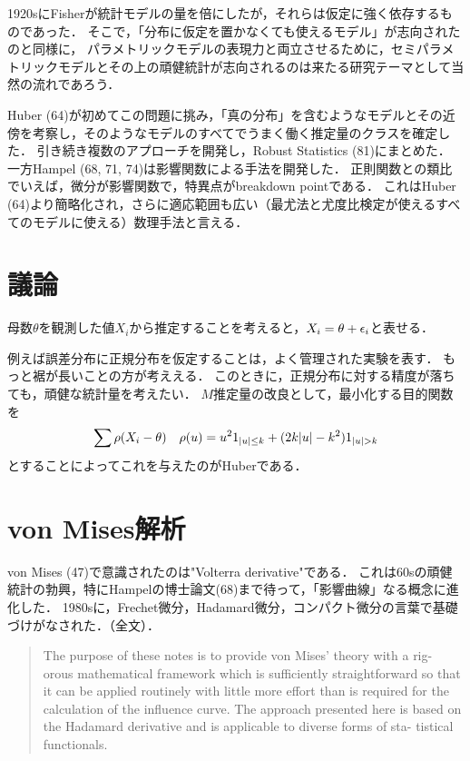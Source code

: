 \documentclass[uplatex,dvipdfmx]{jsreport}
\begin{document}
\begin{history}
    1920sにFisherが統計モデルの量を倍にしたが，それらは仮定に強く依存するものであった．
    そこで，「分布に仮定を置かなくても使えるモデル」が志向されたのと同様に，
    パラメトリックモデルの表現力と両立させるために，セミパラメトリックモデルとその上の頑健統計が志向されるのは来たる研究テーマとして当然の流れであろう．

    Huber (64)が初めてこの問題に挑み，「真の分布」を含むようなモデルとその近傍を考察し，そのようなモデルのすべてでうまく働く推定量のクラスを確定した．
    引き続き複数のアプローチを開発し，Robust Statistics (81)にまとめた．
    一方Hampel (68, 71, 74)は影響関数による手法を開発した．
    正則関数との類比でいえば，微分が影響関数で，特異点がbreakdown pointである．
    これはHuber (64)より簡略化され，さらに適応範囲も広い（最尤法と尤度比検定が使えるすべてのモデルに使える）数理手法と言える．
\end{history}

\section{議論}

母数$\theta$を観測した値$X_i$から推定することを考えると，$X_i=\theta+\epsilon_i$と表せる．


例えば誤差分布に正規分布を仮定することは，よく管理された実験を表す．
もっと裾が長いことの方が考ええる．
このときに，正規分布に対する精度が落ちても，頑健な統計量を考えたい．
$M$推定量の改良として，最小化する目的関数を
\[\sum\rho(X_i-\theta)\quad\rho(u)=u^21_{\lvert u\rvert\le k}+(2k\lvert u\rvert-k^2)1_{\lvert u\rvert>k}\]
とすることによってこれを与えたのがHuberである．

\section{von Mises解析}

\begin{history}
    von Mises (47)で意識されたのは"Volterra derivative"である．
    これは60sの頑健統計の勃興，特にHampelの博士論文(68)まで待って，「影響曲線」なる概念に進化した．
    1980sに，Frechet微分，Hadamard微分，コンパクト微分の言葉で基礎づけがなされた．（\cite{von Mises calculus}全文）．
    \begin{quote}
        The purpose of these notes is to provide von Mises' theory with a rig-
orous mathematical framework which is sufficiently straightforward so that it can be applied routinely with little more effort than is required for the calculation of the influence curve. The approach presented here is based on the Hadamard derivative and is applicable to diverse forms of sta- tistical functionals.\cite{von Mises calculus}
    \end{quote}
\end{history}
\end{document}
